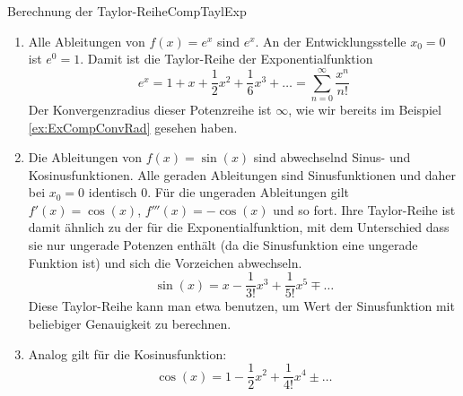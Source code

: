 \begin{example}{Berechnung der Taylor-Reihe}{CompTaylExp}
    \begin{enumerate}
        \item Alle Ableitungen von $f(x)=e^x$ sind $e^x$. An der Entwicklungsstelle $x_0=0$ ist $e^0 = 1$. Damit ist die Taylor-Reihe der Exponentialfunktion
        \begin{equation}
            e^x = 1 + x + \frac{1}{2} x^2 + \frac{1}{6}x^3 + \dots = \sum\limits_{n=0}^\infty \frac{x^n}{n!}
        \end{equation}
        Der Konvergenzradius dieser Potenzreihe ist $\infty$, wie wir bereits im Beispiel \ref{ex:ExCompConvRad} gesehen haben.
        \item Die Ableitungen von $f(x) =\sin(x)$ sind abwechselnd Sinus- und Kosinusfunktionen. Alle geraden Ableitungen sind Sinusfunktionen und daher bei $x_0=0$ identisch $0$. Für die ungeraden Ableitungen gilt $f'(x) = \cos(x)$, $f'''(x) = -\cos(x)$ und so fort. Ihre Taylor-Reihe ist damit ähnlich zu der für die Exponentialfunktion, mit dem Unterschied dass sie nur ungerade Potenzen enthält (da die Sinusfunktion eine ungerade Funktion ist) und sich die Vorzeichen abwechseln.
        \begin{equation}
            \sin(x) = x - \frac{1}{3!}x^3 + \frac{1}{5!} x^5 \mp \dots
        \end{equation}
        Diese Taylor-Reihe kann man etwa benutzen, um Wert der Sinusfunktion mit beliebiger Genauigkeit zu berechnen.
        \item Analog gilt für die Kosinusfunktion:
        \begin{equation}
            \cos(x) = 1 - \frac{1}{2}x^2 + \frac{1}{4!} x^4 \pm \dots
        \end{equation}
    \end{enumerate}
\end{example}

